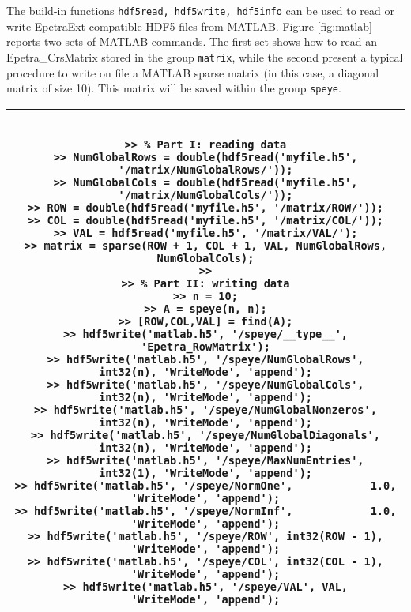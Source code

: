 \documentclass[11pt,relax]{SANDreport}
\begin{document}
The build-in functions {\tt hdf5read, hdf5write, hdf5info} can be used to read
or write EpetraExt-compatible HDF5 files from MATLAB. Figure \ref{fig:matlab}
reports two sets of MATLAB commands. The first set shows how to read an
Epetra\_CrsMatrix stored in the group {\tt matrix}, while the second present
a typical procedure to write on file a MATLAB sparse matrix
(in this case, a diagonal matrix of size 10). This matrix will be saved within
the group {\tt speye}.

\begin{sidewaystable}
\begin{tabular}{| c |}
\hline
\begin{minipage}{22cm}
\begin{verbatim}

>> % Part I: reading data
>> NumGlobalRows = double(hdf5read('myfile.h5', '/matrix/NumGlobalRows/'));
>> NumGlobalCols = double(hdf5read('myfile.h5', '/matrix/NumGlobalCols/'));
>> ROW = double(hdf5read('myfile.h5', '/matrix/ROW/'));
>> COL = double(hdf5read('myfile.h5', '/matrix/COL/'));
>> VAL = hdf5read('myfile.h5', '/matrix/VAL/');
>> matrix = sparse(ROW + 1, COL + 1, VAL, NumGlobalRows, NumGlobalCols);
>>
>> % Part II: writing data
>> n = 10;
>> A = speye(n, n);
>> [ROW,COL,VAL] = find(A);
>> hdf5write('matlab.h5', '/speye/__type__',           'Epetra_RowMatrix');
>> hdf5write('matlab.h5', '/speye/NumGlobalRows',      int32(n), 'WriteMode', 'append');
>> hdf5write('matlab.h5', '/speye/NumGlobalCols',      int32(n), 'WriteMode', 'append');
>> hdf5write('matlab.h5', '/speye/NumGlobalNonzeros',  int32(n), 'WriteMode', 'append');
>> hdf5write('matlab.h5', '/speye/NumGlobalDiagonals', int32(n), 'WriteMode', 'append');
>> hdf5write('matlab.h5', '/speye/MaxNumEntries',      int32(1), 'WriteMode', 'append');
>> hdf5write('matlab.h5', '/speye/NormOne',            1.0,      'WriteMode', 'append');
>> hdf5write('matlab.h5', '/speye/NormInf',            1.0,      'WriteMode', 'append');
>> hdf5write('matlab.h5', '/speye/ROW', int32(ROW - 1), 'WriteMode', 'append');
>> hdf5write('matlab.h5', '/speye/COL', int32(COL - 1), 'WriteMode', 'append');
>> hdf5write('matlab.h5', '/speye/VAL', VAL,            'WriteMode', 'append');

\end{verbatim}
\end{minipage} \\
\hline
\end{tabular}
\caption{Example of input/output for HDF5 from MATLAB.
The use of {\tt double()} is required by sparse, which does not accept {\tt
  int32} data.  }
\label{fig:matlab}
\end{sidewaystable}
\end{document}
